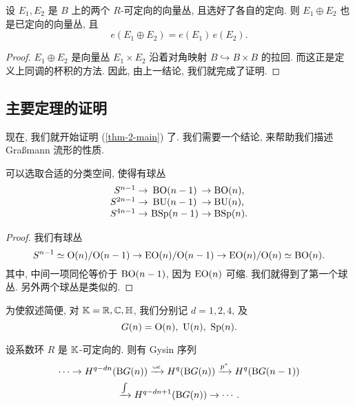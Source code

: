 \begin{corollary}[乘积公式]
    设 $E_1, E_2$ 是 $B$ 上的两个 $R$-可定向的向量丛, 且选好了各自的定向.
    则 $E_1 \oplus E_2$ 也是已定向的向量丛, 且
    \[ e (E_1 \oplus E_2) = e (E_1) \, e (E_2). \]
\end{corollary}

\begin{proof}
    $E_1 \oplus E_2$ 是向量丛 $E_1 \times E_2$
    沿着对角映射 $B \hookrightarrow B \times B$ 的拉回.
    而这正是定义上同调的杯积的方法.
    因此, 由上一结论, 我们就完成了证明.
\end{proof}

\subsection{主要定理的证明}

现在, 我们就开始证明 (\ref{thm-2-main}) 了.
我们需要一个结论, 来帮助我们描述 Graßmann 流形的性质.

\begin{proposition} \label{thm-2-sbun}
    可以选取合适的分类空间, 使得有球丛
    \[ \arraycolsep=.16em
    \begin{array}{rcl}
        S^{ n - 1} \to & \upB \upO(n - 1) & \to \upB \upO(n), \\
        S^{2n - 1} \to & \upB \upU(n - 1) & \to \upB \upU(n), \\
        S^{4n - 1} \to & \upB \Sp (n - 1) & \to \upB \Sp (n).
    \end{array} \]
\end{proposition}

\begin{proof}
    我们有球丛
    \[ 
        S^{n-1} \simeq \mathrm{O}(n) / \mathrm{O}(n-1)
        \to \mathrm{E} \mathrm{O}(n) / \mathrm{O}(n - 1)
        \to \mathrm{E} \mathrm{O}(n) / \mathrm{O}(n) \simeq \mathrm{B} \mathrm{O}(n).
    \]
    其中, 中间一项同伦等价于 $\mathrm{B}\mathrm{O}(n - 1)$, 因为 $\mathrm{E}\mathrm{O}(n)$ 可缩. 
    我们就得到了第一个球丛.
    另外两个球丛是类似的. 
\end{proof}

为使叙述简便, 对 $\mathbb{K} = \mathbb{R}, \mathbb{C}, \mathbb{H}$, 我们分别记 $d = 1, 2, 4$, 及
\[ G(n) = \upO(n),\ \upU(n),\ \Sp(n). \]

\begin{corollary} \label{thm-2-bg-gysin}
    设系数环 $R$ 是 $\mathbb{K}$-可定向的. 则有 Gysin 序列
    \begin{multline*}
        \cdots \to H^{q - dn} (\upB G(n))
        \xrightarrow{\smallcup e} H^q (\upB G(n))
        \xrightarrow{p^*} H^q (\upB G(n - 1)) \\
        \xrightarrow{\int} H^{q - dn + 1} (\upB G(n)) \to \cdots.
    \end{multline*}
\end{corollary}

